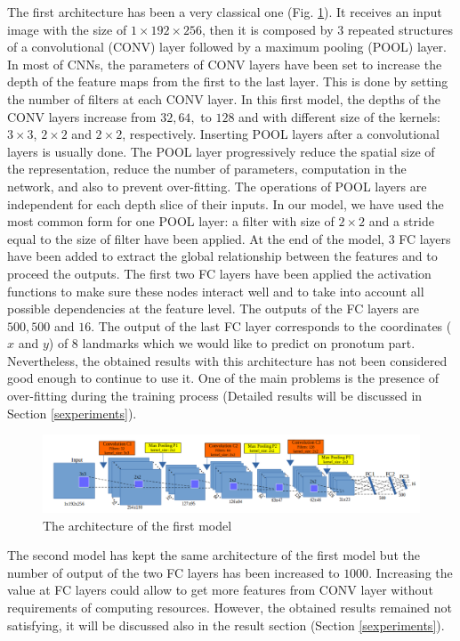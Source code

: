 \documentclass[review]{elsarticle}
\begin{document}
The first architecture has been a very classical one (Fig. \ref{fignet1}). It receives an input image with the size of $1 \times 192 \times 256$, then it is composed by $3$ repeated structures of a convolutional (CONV) layer followed by a maximum pooling (POOL) layer. In most of CNNs, the parameters of CONV layers have been set to increase the depth of the feature maps from the first  to the last layer. This is done by setting the number of filters at each CONV layer. In this first model, the depths of the CONV layers increase from $32, 64, $ to $128$ and with different size of the kernels: $3 \times 3$, $2 \times 2$ and $2 \times 2$, respectively. Inserting POOL layers after a convolutional layers is usually done. The POOL layer progressively reduce the spatial size of the representation, reduce the number of parameters, computation in the network, and also to prevent over-fitting. The operations of POOL layers are independent for each depth slice of their inputs. In our model, we have used the most common form for one POOL layer: a filter with size of $2 \times 2$ and a stride equal to the size of filter have been applied. At the end of the model, $3$ FC layers have been added to extract the global relationship between the features and to proceed the outputs. The first two FC layers have been applied the activation functions to make sure these nodes interact well and to take into account all possible dependencies at the feature level. The outputs of the FC layers are $500, 500$ and $16$. The output of the last FC layer corresponds to the coordinates ($x$ and $y$) of $8$ landmarks which we would like to predict on pronotum part. Nevertheless, the obtained results with this architecture has not been considered good enough to continue to use it. One of the main problems is the presence of over-fitting during the training process (Detailed results will be discussed in Section \ref{sexperiments}).
\begin{figure}[!h]
	\centering
	\includegraphics[scale=0.3]{images/net1}
	\caption{The architecture of the first model}
	\label{fignet1}
\end{figure}

The second model has kept the same architecture of the first model but the number of output of the two FC layers has been increased to $1000$. Increasing the value at FC layers could allow to get more features from CONV layer without requirements of computing resources. However, the obtained results remained not satisfying, it will be discussed also in the result section (Section \ref{sexperiments}). 
\end{document}
